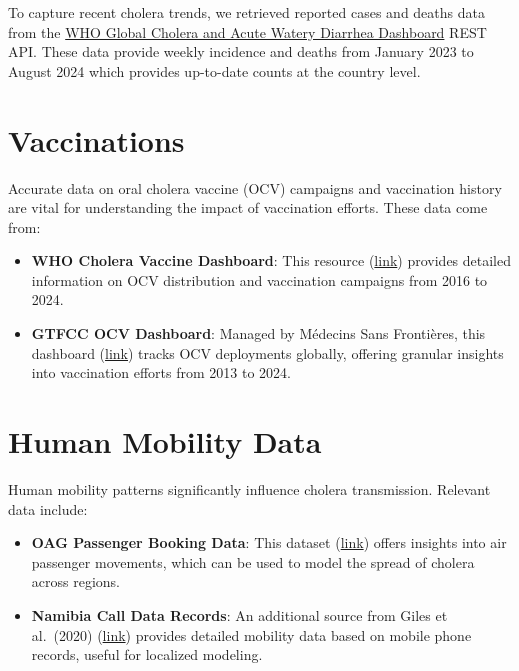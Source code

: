 \documentclass[
]{book}
\providecommand{\tightlist}{%
  \setlength{\itemsep}{0pt}\setlength{\parskip}{0pt}}
\begin{document}
To capture recent cholera trends, we retrieved reported cases and deaths data from the \href{https://who-global-cholera-and-awd-dashboard-1-who.hub.arcgis.com/}{WHO Global Cholera and Acute Watery Diarrhea Dashboard} REST API. These data provide weekly incidence and deaths from January 2023 to August 2024 which provides up-to-date counts at the country level.

\section{Vaccinations}\label{vaccinations}

Accurate data on oral cholera vaccine (OCV) campaigns and vaccination history are vital for understanding the impact of vaccination efforts. These data come from:

\begin{itemize}
\tightlist
\item
  \textbf{WHO Cholera Vaccine Dashboard}: This resource (\href{https://www.who.int/groups/icg/cholera}{link}) provides detailed information on OCV distribution and vaccination campaigns from 2016 to 2024.
\item
  \textbf{GTFCC OCV Dashboard}: Managed by Médecins Sans Frontières, this dashboard (\href{https://apps.epicentre-msf.org/public/app/gtfcc}{link}) tracks OCV deployments globally, offering granular insights into vaccination efforts from 2013 to 2024.
\end{itemize}

\section{Human Mobility Data}\label{human-mobility-data}

Human mobility patterns significantly influence cholera transmission. Relevant data include:

\begin{itemize}
\tightlist
\item
  \textbf{OAG Passenger Booking Data}: This dataset (\href{https://www.oag.com/passenger-booking-data}{link}) offers insights into air passenger movements, which can be used to model the spread of cholera across regions.
\item
  \textbf{Namibia Call Data Records}: An additional source from Giles et al.~(2020) (\href{https://www.pnas.org/content/117/36/22572}{link}) provides detailed mobility data based on mobile phone records, useful for localized modeling.
\end{itemize}
\end{document}
